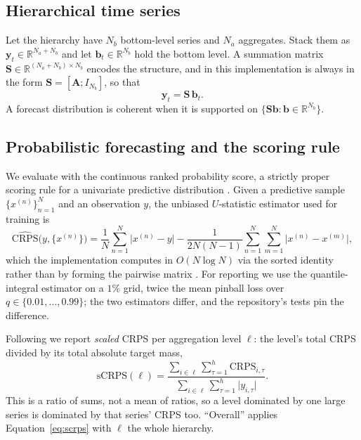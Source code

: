 \documentclass[11pt]{article}
\newcommand{\Nb}{N_{b}}
\newcommand{\Na}{N_{a}}
\newcommand{\bvec}{\mathbf{b}}
\newcommand{\yvec}{\mathbf{y}}
\newcommand{\Smat}{\mathbf{S}}
\newcommand{\Real}{\mathbb{R}}
\begin{document}
\subsection{Hierarchical time series}
Let the hierarchy have $\Nb$ bottom-level series and $\Na$ aggregates. Stack them as
$\yvec_t \in \Real^{\Na+\Nb}$ and let $\bvec_t \in \Real^{\Nb}$ hold the bottom level.
A summation matrix $\Smat \in \Real^{(\Na+\Nb)\times \Nb}$ encodes the structure, and
in this implementation is always in the form $\Smat = [\mathbf{A}; I_{\Nb}]$, so that
\begin{equation}
\yvec_t = \Smat\,\bvec_t .
\end{equation}
A forecast distribution is coherent when it is supported on $\{\Smat \bvec : \bvec \in
\Real^{\Nb}\}$.

\subsection{Probabilistic forecasting and the scoring rule}
We evaluate with the continuous ranked probability score, a strictly proper scoring
rule for a univariate predictive distribution \citep{gneiting2007strictly}. Given a
predictive sample $\{x^{(n)}\}_{n=1}^{N}$ and an observation $y$, the unbiased
$U$-statistic estimator used for training is
\begin{equation}
\widehat{\mathrm{CRPS}}\bigl(y, \{x^{(n)}\}\bigr)
= \frac{1}{N}\sum_{n=1}^{N}\bigl|x^{(n)} - y\bigr|
- \frac{1}{2N(N-1)}\sum_{n=1}^{N}\sum_{m=1}^{N}\bigl|x^{(n)} - x^{(m)}\bigr| ,
\label{eq:crps-mc}
\end{equation}
which the implementation computes in $O(N \log N)$ via the sorted identity rather than
by forming the pairwise matrix \citep{zamo2018crps}. For reporting we use the
quantile-integral estimator on a $1\%$ grid, twice the mean pinball loss over
$q \in \{0.01,\dots,0.99\}$; the two estimators differ, and the repository's tests
pin the difference.

Following \citet{olivares2024clover} we report \emph{scaled} CRPS per aggregation
level $\ell$: the level's total CRPS divided by its total absolute target mass,
\begin{equation}
\mathrm{sCRPS}(\ell)
= \frac{\sum_{i \in \ell}\sum_{\tau=1}^{h}\mathrm{CRPS}_{i,\tau}}
       {\sum_{i \in \ell}\sum_{\tau=1}^{h}\bigl|y_{i,\tau}\bigr|} .
\label{eq:scrps}
\end{equation}
This is a ratio of sums, not a mean of ratios, so a level dominated by one large
series is dominated by that series' CRPS too. ``Overall'' applies
Equation~\eqref{eq:scrps} with $\ell$ the whole hierarchy.
\end{document}
